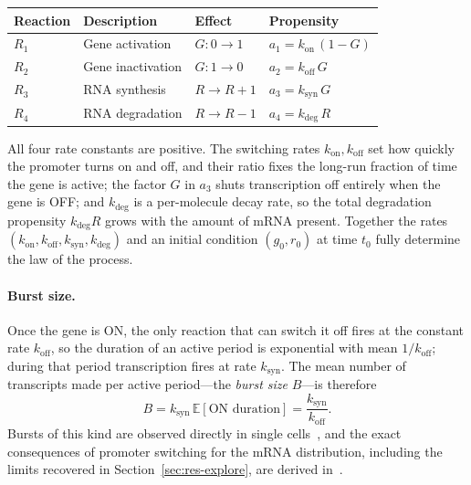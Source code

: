 \documentclass[11pt]{article}
\newcommand{\kon}{k_{\mathrm{on}}}
\newcommand{\koff}{k_{\mathrm{off}}}
\newcommand{\ksyn}{k_{\mathrm{syn}}}
\newcommand{\kdeg}{k_{\mathrm{deg}}}
\newcommand{\E}{\mathbb{E}}
\begin{document}
\begin{center}
\begin{tabular}{llll}
\toprule
\textbf{Reaction} & \textbf{Description} & \textbf{Effect} & \textbf{Propensity} \\
\midrule
$R_1$ & Gene activation   & $G:0\to1$       & $a_1 = \kon\,(1-G)$ \\
$R_2$ & Gene inactivation & $G:1\to0$       & $a_2 = \koff\,G$ \\
$R_3$ & RNA synthesis     & $R\to R+1$      & $a_3 = \ksyn\,G$ \\
$R_4$ & RNA degradation   & $R\to R-1$      & $a_4 = \kdeg\,R$ \\
\bottomrule
\end{tabular}
\end{center}

All four rate constants are positive. The switching rates $\kon,\koff$ set how quickly
the promoter turns on and off, and their ratio fixes the long-run fraction of time the
gene is active; the factor $G$ in $a_3$ shuts transcription off entirely when the gene
is OFF; and $\kdeg$ is a per-molecule decay rate, so the total degradation propensity
$\kdeg R$ grows with the amount of mRNA present. Together the rates
$(\kon,\koff,\ksyn,\kdeg)$ and an initial condition $(g_0,r_0)$ at time $t_0$ fully
determine the law of the process.

\paragraph{Burst size.}
Once the gene is ON, the only
reaction that can switch it off fires at the constant rate $\koff$, so the duration of an active
period is exponential with mean $1/\koff$; during that period transcription fires at rate $\ksyn$.
The mean number of transcripts made per active period---the \emph{burst size} $B$---is therefore
\begin{equation}
\label{eq:burst}
  B = \ksyn\,\E[\text{ON duration}] = \frac{\ksyn}{\koff}.
\end{equation}
Bursts of this kind are observed directly in single cells~\cite{golding2005,raj2006}, and the exact
consequences of promoter switching for the mRNA distribution, including the limits recovered in
Section~\ref{sec:res-explore}, are derived in~\cite{iyerbiswas2009}.
\end{document}
